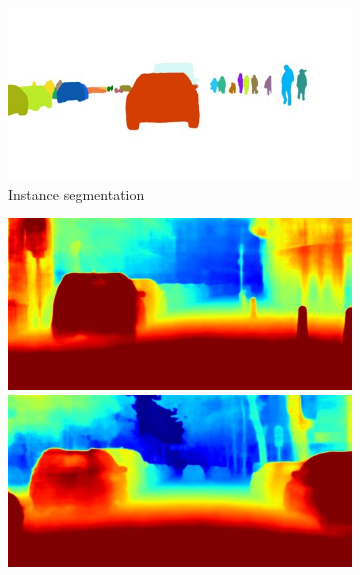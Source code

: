 {\begin{figure}[t]
{{\begin{subfigure}[t]{0.24\linewidth}
\begin{center}
		\includegraphics[width=\linewidth,trim={0px 60px 0 0px},clip]{qualitative/munich_000316_000019_instance_segmentation.jpg}
  \caption{Instance segmentation}
\end{center}
\end{subfigure}
\begin{subfigure}[t]{0.24\linewidth}
\begin{center}
		\includegraphics[width=\linewidth,trim={0px 60px 0 0px},clip]{qualitative/bielefeld_000000_026296_depth_prediction.jpg}
		\includegraphics[width=\linewidth,trim={0px 60px 0 0px},clip]{qualitative/berlin_000008_000019_depth_prediction.jpg}

\end{center}
\end{subfigure}}}
\end{figure}}
